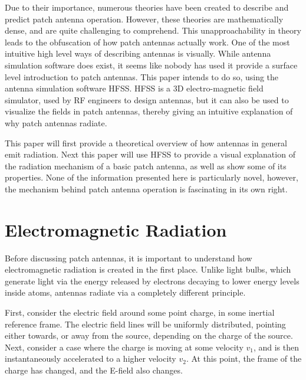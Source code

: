 \documentclass[12pt]{article}
\begin{document}
Due to their importance, numerous theories have been created to describe and predict patch antenna operation. However, these theories are mathematically dense, and are quite challenging to comprehend. This unapproachability in theory leads to the obfuscation of how patch antennas actually work. One of the most intuitive high level ways of describing antennas is visually. While antenna simulation software does exist, it seems like nobody has used it provide a surface level introduction to patch antennas. This paper intends to do so, using the antenna simulation software HFSS. HFSS is a 3D electro-magnetic field simulator, used by RF engineers to design antennas, but it can also be used to visualize the fields in patch antennas, thereby giving an intuitive explanation of why patch antennas radiate.

This paper will first provide a theoretical overview of how antennas in general emit radiation. Next this paper will use HFSS to provide a visual explanation of the radiation mechanism of a basic patch antenna, as well as show some of its properties. None of the information presented here is particularly novel, however, the mechanism behind patch antenna operation is fascinating in its own right. 
\section{Electromagnetic Radiation}  
Before discussing patch antennas, it is important to understand how electromagnetic radiation is created in the first place. Unlike light bulbs, which generate light via the energy released by electrons decaying to lower energy levels inside atoms, antennas radiate via a completely different principle.

First, consider the electric field around some point charge, in some inertial reference frame. The electric field lines will be uniformly distributed, pointing either towards, or away from the source, depending on the charge of the source\cite{schroeder}. Next, consider a case where the charge is moving at some velocity $v_1$, and is then instantaneously accelerated to a higher velocity $v_2$. At this point, the frame of the charge has changed, and the E-field also changes.   
\end{document}

